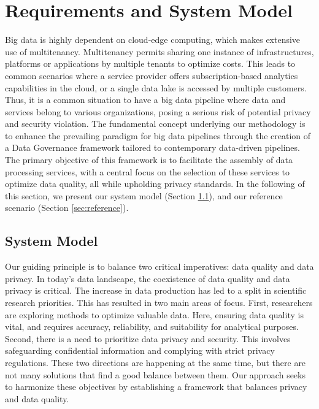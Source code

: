 \section{Requirements and System Model}\label{sec:requirements}
Big data is highly dependent on cloud-edge computing, which makes extensive use of multitenancy.
Multitenancy permits sharing one instance of infrastructures, platforms or applications by multiple tenants to optimize costs.
This leads to common scenarios where a service provider offers subscription-based analytics capabilities in the cloud,
or a single data lake is accessed by multiple customers.
Thus, it is a common situation to have a big data pipeline where data and services belong to various organizations,
posing a serious risk of potential privacy and security violation.
The fundamental concept underlying our methodology is to enhance the prevailing paradigm for big data pipelines through the creation of a Data Governance framework tailored to contemporary data-driven pipelines.
The primary objective of this framework is to facilitate the assembly of data processing services, with a central focus on the selection of these services to optimize data quality, all while upholding privacy standards.
In the following of this section,
we present our system model (Section \ref{sec:systemmodel}),
and our reference scenario (Section \ref{sec:reference}).

\subsection{System Model}\label{sec:systemmodel}

Our guiding principle is to balance two critical imperatives: data quality and data privacy.
In today's data landscape, the coexistence of data quality and data privacy is critical.
The increase in data production has led to a split in scientific research priorities. This has resulted in two main areas of focus.
First, researchers are exploring methods to optimize valuable data. Here, ensuring data quality is vital, and requires accuracy, reliability, and suitability for analytical purposes.
Second, there is a need to prioritize data privacy and security. This involves safeguarding confidential information and complying with strict privacy regulations.
These two directions are happening at the same time, but there are not many solutions that find a good balance between them.
Our approach seeks to harmonize these objectives by establishing a framework that balances privacy and data quality.

